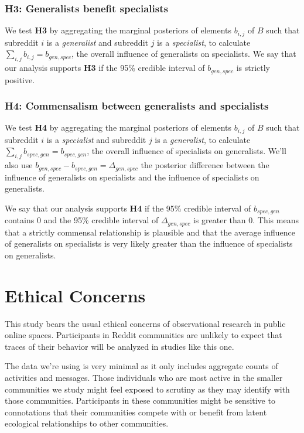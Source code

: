 \documentclass[12pt]{memoir}
\begin{document}
\subsubsection{\textbf{H3:} Generalists benefit specialists}

We test \textbf{H3} by aggregating the marginal posteriors of elements $b_{i,j}$ of $B$ such that subreddit $i$ is a \emph{generalist} and subreddit $j$  is a \emph{specialist}, to calculate $\sum_{i,j}{b_{i,j}} = b_{gen,spec}$, the overall influence of generalists on specialists. We say that our analysis supports \textbf{H3} if the 95\% credible interval of $b_{gen,spec}$ is strictly positive.


\subsubsection{\textbf{H4:} Commensalism between generalists and specialists}

We test \textbf{H4} by aggregating the marginal posteriors of elements $b_{i,j}$ of $B$ such that subreddit $i$ is a \emph{specialist} and subreddit $j$  is a \emph{generalist}, to calculate $\sum_{i,j}{b_{spec,gen}}= b_{spec,gen}$, the overall influence of specialists on generalists.  We'll also use $b_{gen,spec} - b_{spec,gen} = \Delta_{gen,spec}$ the posterior difference between the influence of generalists on specialists and the influence of specialists on generalists. 


We say that our analysis supports \textbf{H4} if the 95\% credible interval of $b_{spec,gen}$ contains 0 and the 95\% credible interval of $\Delta_{gen,spec}$ is greater than 0.  This means that a strictly commensal relationship is plausible and that the average influence of generalists on specialists is very likely greater than the influence of specialists on generalists.

\section{Ethical Concerns}

This study bears the usual ethical concerns of observational research in public online spaces.  Participants in Reddit communities are unlikely to expect that traces of their behavior will be analyzed in studies like this one.  

The data we're using is very minimal as it only includes aggregate counts of activities and messages.  Those individuals who are most active in the smaller communities we study might feel exposed to scrutiny as they may identify with those communities.  Participants in these communities might be sensitive to connotations that their communities compete with or benefit from latent ecological relationships to other communities.  
\end{document}
